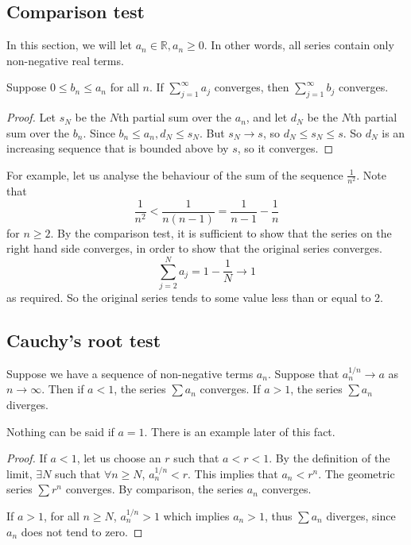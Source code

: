 \subsection{Comparison test}
In this section, we will let \(a_n \in \mathbb R, a_n \geq 0\).
In other words, all series contain only non-negative real terms.
\begin{theorem}
	Suppose \(0 \leq b_n \leq a_n\) for all \(n\).
	If \(\sum_{j=1}^\infty a_j\) converges, then \(\sum_{j=1}^\infty b_j\) converges.
\end{theorem}
\begin{proof}
	Let \(s_N\) be the \(N\)th partial sum over the \(a_n\), and let \(d_N\) be the \(N\)th partial sum over the \(b_n\).
	Since \(b_n \leq a_n, d_N \leq s_N\).
	But \(s_N \to s\), so \(d_N \leq s_N \leq s\).
	So \(d_N\) is an increasing sequence that is bounded above by \(s\), so it converges.
\end{proof}
For example, let us analyse the behaviour of the sum of the sequence \(\frac{1}{n^2}\).
Note that
\[
	\frac{1}{n^2} < \frac{1}{n(n-1)} = \frac{1}{n-1} - \frac{1}{n}
\]
for \(n \geq 2\).
By the comparison test, it is sufficient to show that the series on the right hand side converges, in order to show that the original series converges.
\[
	\sum_{j=2}^N a_j = 1 - \frac{1}{N} \to 1
\]
as required.
So the original series tends to some value less than or equal to 2.

\subsection{Cauchy's root test}
\begin{theorem}
	Suppose we have a sequence of non-negative terms \(a_n\).
	Suppose that \(a_n^{1/n} \to a\) as \(n \to \infty\).
	Then if \(a < 1\), the series \(\sum a_n\) converges.
	If \(a > 1\), the series \(\sum a_n\) diverges.
\end{theorem}
\begin{remark}
	Nothing can be said if \(a=1\).
	There is an example later of this fact.
\end{remark}
\begin{proof}
	If \(a < 1\), let us choose an \(r\) such that \(a < r < 1\).
	By the definition of the limit, \(\exists N\) such that \(\forall n \geq N\), \(a_n^{1/n} < r\).
	This implies that \(a_n < r^n\).
	The geometric series \(\sum r^n\) converges.
	By comparison, the series \(a_n\) converges.

	If \(a > 1\), for all \(n \geq N\), \(a_n^{1/n} > 1\) which implies \(a_n > 1\), thus \(\sum a_n\) diverges, since \(a_n\) does not tend to zero.
\end{proof}

